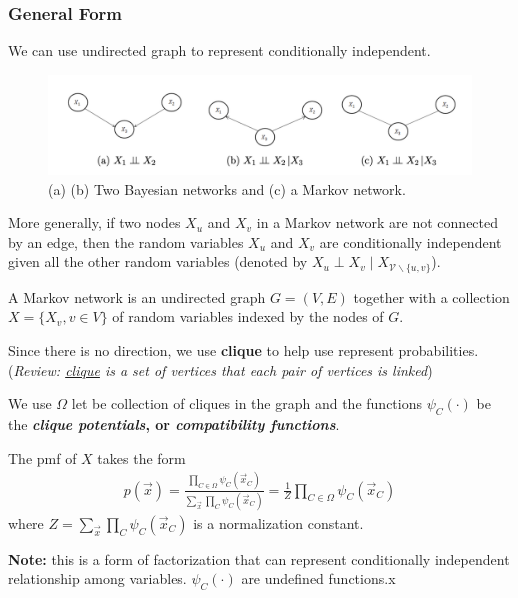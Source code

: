\documentclass[11pt,a4paper]{article}
\begin{document}
\subsubsection{General Form}
We can use undirected graph to represent conditionally independent.
\begin{center}\begin{figure}[htbp]
    \centering
    \includegraphics[scale=0.2]{BM.png}
    \caption{(a) (b) Two Bayesian networks and (c) a Markov network.}
    \label{}
\end{figure}\end{center}
More generally, if two nodes $X_u$ and $X_v$ in a Markov network are not connected by an edge, then the random variables $X_u$ and $X_v$ are conditionally independent given all the other random variables (denoted by $X_u \perp X_v \mid X_{\mathcal{V} \backslash\{u, v\}}$).

A Markov network is an undirected graph $G = (V,E)$ together with a collection $X = \{X_v, v \in V\}$ of random variables indexed by the nodes of $G$.

Since there is no direction, we use \textbf{clique} to help use represent probabilities. (\textit{Review: \underline{clique} is a set of vertices that each pair of vertices is linked})

We use $\Omega$ let be collection of cliques in the graph and the functions $\psi_C(\cdot)$ be the \textbf{\textit{clique potentials}, or \textit{compatibility functions}}.

The pmf of $X$ takes the form
\begin{equation}
    \begin{aligned}
        p(\vec{x})=\frac{\prod_{C\in \Omega}\psi_C(\vec{x}_C)}{\sum_{\vec{x}}\prod_{C}\psi_C(\vec{x}_C)}=\frac{1}{Z}\prod_{C\in \Omega}\psi_C(\vec{x}_C)
    \end{aligned}
    \nonumber
\end{equation}
where $Z=\sum_{\vec{x}}\prod_{C}\psi_C(\vec{x}_C)$ is a normalization constant.

\textbf{Note:} this is a form of factorization that can represent conditionally independent relationship among variables. $\psi_C(\cdot)$ are undefined functions.x
\end{document}
